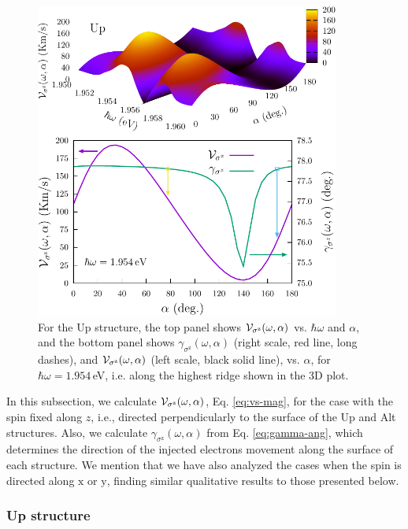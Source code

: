 \documentclass[floatfix,prb,aps,superscriptaddress,showpacs,11pt,preprint,letterpaper]{revtex4}
\def\tama{10cm}
\begin{document}
\begin{figure}[t]
\centering
\includegraphics[width=\tama]{figures/fig5}
\caption{For the Up structure, the top panel shows ${\cal
V}_{\sigma^\mathrm{z}} (\omega,\alpha)$ vs. $\hbar\omega$ and $\alpha$, and the
bottom panel shows $\gamma_{\sigma^\mathrm{z}} (\omega,\alpha)$ (right scale,
red line, long dashes), and ${\cal V}_{\sigma^\mathrm{z}} (\omega,\alpha)$
(left scale, black solid line), vs. $\alpha$, for $\hbar\omega=1.954$\,eV, i.e.
along the highest ridge shown in the 3D plot. }
\label{fig:up-vsz-w2}
\end{figure}

In this subsection, we calculate ${\cal V}_{\sigma^\mathrm{z}}(\omega,\alpha)$,
Eq. \eqref{eq:vs-mag}, for the case with the spin fixed along $z$, i.e.,
directed perpendicularly to the surface of the Up and Alt structures. Also, we
calculate $\gamma_{\sigma^\mathrm{z}}(\omega,\alpha)$ from Eq. 
\eqref{eq:gamma-ang}, which determines the direction  of the injected 
electrons movement along the surface of  each structure. We mention that we
have also  analyzed the cases when the spin  is directed along $\mathrm{x}$ or
$\mathrm{y}$, finding similar qualitative results to those presented below.

\subsubsection{Up structure}\label{up:fs}
\end{document}
